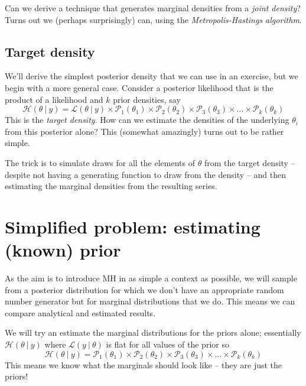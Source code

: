 \documentclass[
  letterpaper,
]{book}
\begin{document}
Can we derive a technique that generates marginal densities from a
\emph{joint density}? Turns out we (perhaps surprisingly) can, using the
\emph{Metropolis-Hastings algorithm}.

\hypertarget{target-density}{%
\subsection{Target density}\label{target-density}}

We'll derive the simplest posterior density that we can use in an
exercise, but we begin with a more general case. Consider a posterior
likelihood that is the product of a likelihood and \(k\) prior
densities, say \begin{equation}
 \mathcal{H}(\theta\ | \ y) = \mathcal{L}(\theta\ | \ y)\times \mathcal{P}_1(\theta_1)\times \mathcal{P}_2(\theta_2)\times \mathcal{P}_3(\theta_3)\times ...\times \mathcal{P}_k(\theta_k)
\end{equation} This is the \emph{target density}. How can we estimate
the densities of the underlying \(\theta_i\) from this posterior alone?
This (somewhat amazingly) turns out to be rather simple.

The trick is to simulate draws for all the elements of \(\theta\) from
the target density -- despite not having a generating function to draw
from the density -- and then estimating the marginal densities from the
resulting series.

\hypertarget{simplified-problem-estimating-known-prior}{%
\section{Simplified problem: estimating (known)
prior}\label{simplified-problem-estimating-known-prior}}

As the aim is to introduce MH in as simple a context as possible, we
will sample from a posterior distribution for which we don't have an
appropriate random number generator but for marginal distributions that
we do. This means we can compare analytical and estimated results.

We will try an estimate the marginal distributions for the priors alone;
essentially \(\mathcal{H}(\theta\ | \ y)\) where
\(\mathcal{L}(y\ |\ \theta)\) is flat for all values of the prior so
\begin{equation}
 \mathcal{H}(\theta\ | \ y) = \mathcal{P}_1(\theta_1)\times \mathcal{P}_2(\theta_2)\times \mathcal{P}_3(\theta_3)\times ...\times \mathcal{P}_k(\theta_k)
\end{equation} This means we know what the marginals should look like --
they are just the priors!
\end{document}
